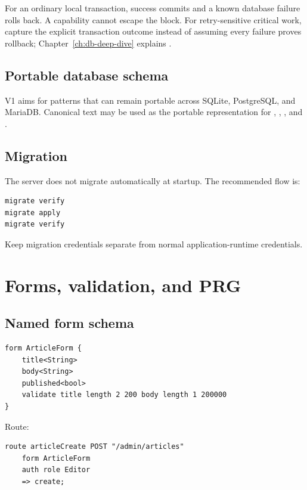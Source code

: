 For an ordinary local transaction, success commits and a known database failure rolls back. A  capability cannot escape the block. For retry-sensitive critical work, capture the explicit transaction outcome instead of assuming every failure proves rollback; Chapter~\ref{ch:db-deep-dive} explains .

\subsection*{Portable database schema}

V1 aims for patterns that can remain portable across SQLite, PostgreSQL, and MariaDB. Canonical text may be used as the portable representation for , , , and .

\subsection*{Migration}

The server does not migrate automatically at startup. The recommended flow is:

\begin{lstlisting}
migrate verify
migrate apply
migrate verify
\end{lstlisting}

Keep migration credentials separate from normal application-runtime credentials.

\section{Forms, validation, and PRG}

\subsection*{Named form schema}

\begin{lstlisting}[language=Velran]
form ArticleForm {
    title<String>
    body<String>
    published<bool>
    validate title length 2 200 body length 1 200000
}
\end{lstlisting}

Route:

\begin{lstlisting}[language=Velran]
route articleCreate POST "/admin/articles"
    form ArticleForm
    auth role Editor
    => create;
\end{lstlisting}

